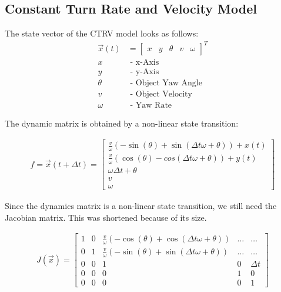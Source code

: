 \documentclass[11pt,oneside,openright]{mpreport}
\begin{document}
\subsection{Constant Turn Rate and Velocity Model}
The state vector \cite{Schubert2008} of the CTRV model looks as follows:
\begin{align*}
\vec{x}(t) &=
\begin{bmatrix}
x & y & \theta & v & \omega
\end{bmatrix}^T\\
x &\text{ - x-Axis}\\
y &\text{ - y-Axis}\\
\theta &\text{ - Object Yaw Angle}\\
v &\text{ - Object Velocity}\\
\omega &\text{ - Yaw Rate}
\end{align*}

The dynamic matrix is obtained by a non-linear state transition:

\begin{align*}
f = \vec{x}(t + \Delta t)=
\begin{bmatrix}
\frac{v}{\omega} (-\sin(\theta) + \sin(\Delta t \omega + \theta)) + x(t) \\
\frac{v}{\omega} (\cos(\theta) - cos(\Delta t \omega + \theta)) + y(t) \\
\omega \Delta t + \theta\\
v\\
\omega
\end{bmatrix} 
\end{align*}

Since the dynamics matrix is a non-linear state transition, we still need the Jacobian matrix. This was shortened because of its size.
 
 
\begin{align*}
J(\vec{x})=
\begin{bmatrix}
1 & 0 & \frac{v}{\omega} (-\cos(\theta) + \cos(\Delta t \omega + \theta))& \dots & \dots \\
0 & 1 & \frac{v}{\omega} (-\sin(\theta) + \sin(\Delta t \omega + \theta))& \dots & \dots \\
0 & 0 & 1 & 0 & \Delta t\\
0 & 0 & 0 & 1 & 0\\
0 & 0 & 0 & 0 & 1
\end{bmatrix} 
\end{align*}
\end{document}
